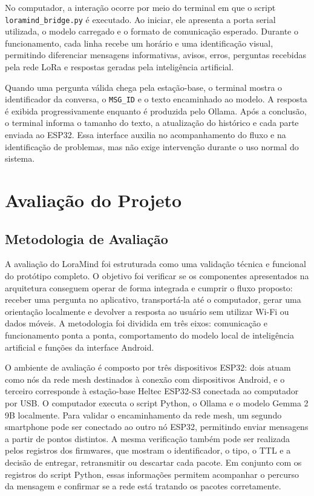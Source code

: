 \documentclass[12pt]{article}
\begin{document}
No computador, a interação ocorre por meio do terminal em que o script \texttt{loramind\_bridge.py} é executado. Ao iniciar, ele apresenta a porta serial utilizada, o modelo carregado e o formato de comunicação esperado. Durante o funcionamento, cada linha recebe um horário e uma identificação visual, permitindo diferenciar mensagens informativas, avisos, erros, perguntas recebidas pela rede LoRa e respostas geradas pela inteligência artificial.

Quando uma pergunta válida chega pela estação-base, o terminal mostra o identificador da conversa, o \texttt{MSG\_ID} e o texto encaminhado ao modelo. A resposta é exibida progressivamente enquanto é produzida pelo Ollama. Após a conclusão, o terminal informa o tamanho do texto, a atualização do histórico e cada parte enviada ao ESP32. Essa interface auxilia no acompanhamento do fluxo e na identificação de problemas, mas não exige intervenção durante o uso normal do sistema.


\section{Avaliação do Projeto}
\label{sec:avaliacao-projeto}

\subsection{Metodologia de Avaliação}

A avaliação do LoraMind foi estruturada como uma validação técnica e funcional do protótipo completo. O objetivo foi verificar se os componentes apresentados na arquitetura conseguem operar de forma integrada e cumprir o fluxo proposto: receber uma pergunta no aplicativo, transportá-la até o computador, gerar uma orientação localmente e devolver a resposta ao usuário sem utilizar Wi-Fi ou dados móveis. A metodologia foi dividida em três eixos: comunicação e funcionamento ponta a ponta, comportamento do modelo local de inteligência artificial e funções da interface Android.

O ambiente de avaliação é composto por três dispositivos ESP32: dois atuam como nós da rede mesh destinados à conexão com dispositivos Android, e o terceiro corresponde à estação-base Heltec ESP32-S3 conectada ao computador por USB. O computador executa o script Python, o Ollama e o modelo Gemma 2 9B localmente. Para validar o encaminhamento da rede mesh, um segundo smartphone pode ser conectado ao outro nó ESP32, permitindo enviar mensagens a partir de pontos distintos. A mesma verificação também pode ser realizada pelos registros dos firmwares, que mostram o identificador, o tipo, o TTL e a decisão de entregar, retransmitir ou descartar cada pacote. Em conjunto com os registros do script Python, essas informações permitem acompanhar o percurso da mensagem e confirmar se a rede está tratando os pacotes corretamente.
\end{document}
